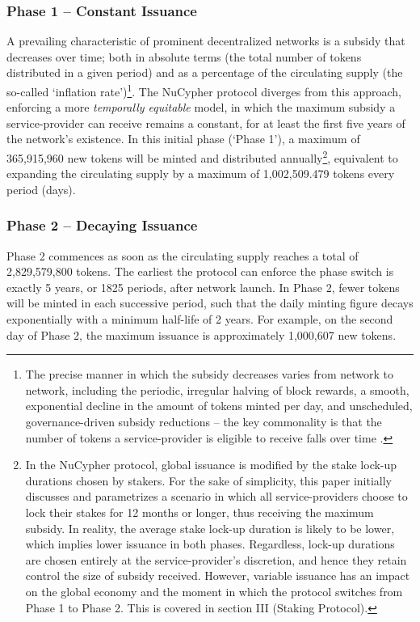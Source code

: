 \documentclass[longbibliography,nofootinbib]{revtex4-1}
\begin{document}
\subsubsection{Phase 1 – Constant Issuance}
A prevailing characteristic of prominent decentralized networks is a subsidy that decreases over time; both in absolute terms (the total number of tokens distributed in a given period) and as a percentage of the circulating supply (the so-called `inflation rate')\footnote{The precise manner in which the subsidy decreases varies from network to network, including the periodic, irregular halving of block rewards, a smooth, exponential decline in the amount of tokens minted per day, and unscheduled, governance-driven subsidy reductions – the key commonality is that the number of tokens a service-provider is eligible to receive falls over time \cite{Decreasing-subsidy}.}. The NuCypher protocol diverges from this approach, enforcing a more \textit{temporally equitable} model, in which the maximum subsidy a service-provider can receive remains a constant, for at least the first five years of the network's existence. In this initial phase (`Phase 1'), a maximum of 365,915,960 new tokens will be minted and distributed annually\footnote{In the NuCypher protocol, global issuance is modified by the stake lock-up durations chosen by stakers. For the sake of simplicity, this paper initially discusses and parametrizes a scenario in which all service-providers choose to lock their stakes for 12 months or longer, thus receiving the maximum subsidy. In reality, the average stake lock-up duration is likely to be lower, which implies lower issuance in both phases. Regardless, lock-up durations are chosen entirely at the service-provider's discretion, and hence they retain control the size of subsidy received. However, variable issuance has an impact on the global economy and the moment in which the protocol switches from Phase 1 to Phase 2. This is covered in section III (Staking Protocol).}, equivalent to expanding the circulating supply by a maximum of 1,002,509.479 tokens every period (days). 

\subsubsection{Phase 2 – Decaying Issuance}
Phase 2 commences as soon as the circulating supply reaches a total of 2,829,579,800 tokens. The earliest the protocol can enforce the phase switch is exactly 5 years, or 1825 periods, after network launch. In Phase 2, fewer tokens will be minted in each successive period, such that the daily minting figure decays exponentially with a minimum half-life of 2 years. For example, on the second day of Phase 2, the maximum issuance is approximately 1,000,607 new tokens.
\end{document}
